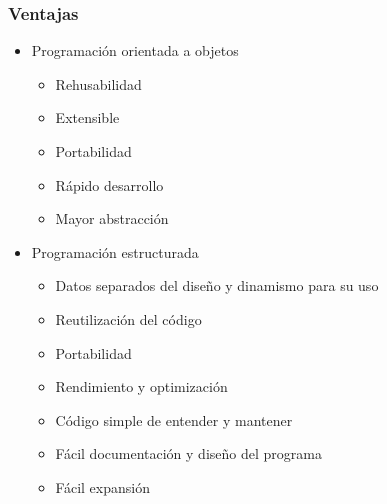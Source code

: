 \documentclass[a4paper, 11pt, titlepage]{article}
\begin{document}
    \subsubsection{Ventajas}
    \begin{itemize}
        \item Programación orientada a objetos
        \begin{itemize}
            \item Rehusabilidad
            \item Extensible
            \item Portabilidad
            \item Rápido desarrollo
            \item Mayor abstracción        
        \end{itemize}
        \item Programación estructurada
        \begin{itemize}
            \item Datos separados del diseño y dinamismo para su uso
            \item Reutilización del código
            \item Portabilidad
            \item Rendimiento y optimización
            \item Código simple de entender y mantener
            \item Fácil documentación y diseño del programa
            \item Fácil expansión
        \end{itemize}
    \end{itemize}
\end{document}
